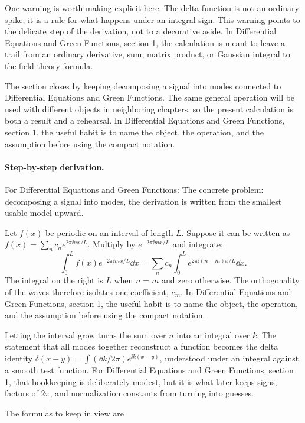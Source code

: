 One warning is worth making explicit here.  The delta function is not an ordinary spike; it is a rule for what happens under an integral sign.  This warning points to the delicate step of the derivation, not to a decorative aside.  In Differential Equations and Green Functions, section 1, the calculation is meant to leave a trail from an ordinary derivative, sum, matrix product, or Gaussian integral to the field-theory formula.

The section closes by keeping decomposing a signal into modes connected to Differential Equations and Green Functions.  The same general operation will be used with different objects in neighboring chapters, so the present calculation is both a result and a rehearsal.  In Differential Equations and Green Functions, section 1, the useful habit is to name the object, the operation, and the assumption before using the compact notation.



\paragraph{Step-by-step derivation.}

For Differential Equations and Green Functions: The concrete problem: decomposing a signal into modes, the derivation is written from the smallest usable model upward.

Let \(f(x)\) be periodic on an interval of length \(L\).  Suppose it can be written as \(f(x)=\sum_n c_ne^{2\pi\ii nx/L}\).  Multiply by \(e^{-2\pi\ii mx/L}\) and integrate:
\[
  \int_0^L f(x)e^{-2\pi\ii mx/L}\dd x
  =
  \sum_n c_n\int_0^L e^{2\pi\ii(n-m)x/L}\dd x.
\]
The integral on the right is \(L\) when \(n=m\) and zero otherwise.  The orthogonality of the waves therefore isolates one coefficient, \(c_m\).  In Differential Equations and Green Functions, section 1, the useful habit is to name the object, the operation, and the assumption before using the compact notation.

Letting the interval grow turns the sum over \(n\) into an integral over \(k\).  The statement that all modes together reconstruct a function becomes the delta identity \(\delta(x-y)=\int(\dd k/2\pi)e^{\ii k(x-y)}\), understood under an integral against a smooth test function.  For Differential Equations and Green Functions, section 1, that bookkeeping is deliberately modest, but it is what later keeps signs, factors of \(2\pi\), and normalization constants from turning into guesses.

The formulas to keep in view are

